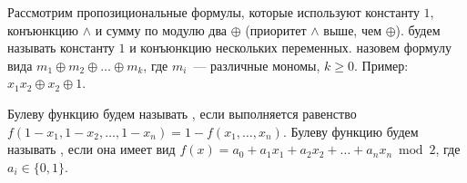 

\setmathstyle{}{}{}




\begin{definition*}
    Рассмотрим пропозициональные формулы, которые используют константу $1$, конъюнкцию $\land$ и сумму по
    модулю два $\oplus$ (приоритет $\land$ выше, чем $\oplus$).  будем называть
    константу $1$ и конъюнкцию нескольких переменных.  назовем формулу
    вида $m_1 \oplus m_2 \oplus \dots \oplus m_k$, где $m_i$~--- различные мономы, $k \ge 0$. Пример:
    $x_1 x_2 \oplus x_2 \oplus 1$.
\end{definition*}


\begin{definition*}
    Булеву функцию будем называть , если выполняется равенство $f(1 - x_1, 1 -
    x_2, \dots, 1 - x_n) = 1 - f(x_1, \dots, x_n)$. Булеву функцию будем называть ,
    если она имеет вид $f(x) = a_0 + a_1 x_1 + a_2 x_2 + \dots + a_nx_n \bmod 2$, где $a_i \in \{0,
    1\}$.
\end{definition*}








